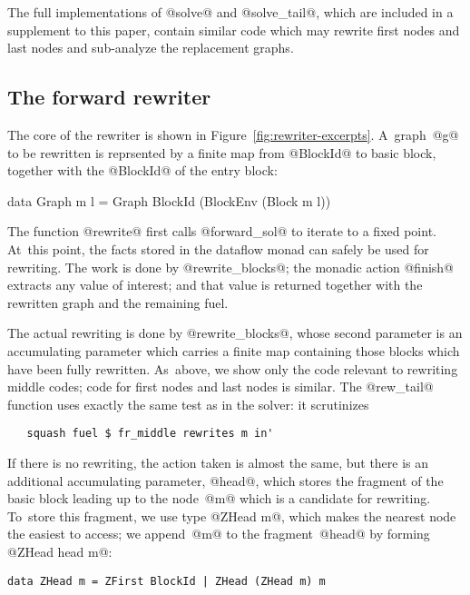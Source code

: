 \documentclass[blockstyle,preprint,nocopyrightspace]{sigplanconf}
\newcommand\figref[1]{Figure~\ref{fig:#1}}
\begin{document}
The full implementations of @solve@ and @solve_tail@, which are
included in a supplement to this paper, contain similar code which may
rewrite first nodes and last nodes and sub-analyze the replacement
graphs. 





\subsection{The forward rewriter}

The core of the rewriter is shown in \figref{rewriter-excerpts}.
A~graph~@g@ to be rewritten is reprsented by a finite map from  @BlockId@
  to basic block, together with the @BlockId@ of the entry block:
\begin{code}
data Graph m l = Graph BlockId (BlockEnv (Block m l))
\end{code}
The function @rewrite@ first calls @forward_sol@ to iterate to a fixed
point.
At~this point, the facts stored in the dataflow monad can safely be
used for rewriting.
The work is done by @rewrite_blocks@; the monadic action @finish@
extracts any value of interest; and that value is returned together
with the rewritten graph and the remaining fuel.

The actual rewriting is done by @rewrite_blocks@, whose second parameter is
an accumulating parameter which carries a finite map containing those
blocks which have been fully rewritten.
As~above, we show only the code relevant to rewriting middle codes;
code for first nodes and last nodes is similar.
The @rew_tail@ function uses exactly the same test as in the solver:
it scrutinizes
\begin{verbatim}
   squash fuel $ fr_middle rewrites m in'
\end{verbatim}
If there is no rewriting, the action taken is almost the same, but
there is an additional accumulating parameter, @head@, which stores
the fragment of the basic block leading up to the node~@m@ which is
a candidate for rewriting.
To~store this fragment, we use type @ZHead m@, which makes the
nearest node the easiest to access; we append~@m@ to the
fragment~@head@ by forming @ZHead head m@:
\begin{verbatim} 
data ZHead m = ZFirst BlockId | ZHead (ZHead m) m
\end{verbatim}
\end{document}
